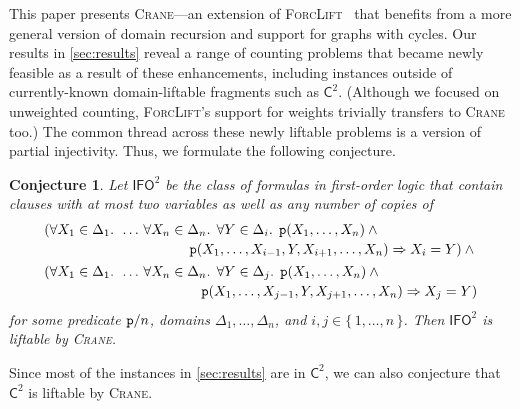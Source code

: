 \documentclass{article}
\newtheorem{conjecture}{Conjecture}
\newcommand{\Ctwo}{$\mathsf{C}^{2}$}
\newcommand{\IFO}{$\mathsf{I}\mathsf{FO}^{2}$}
\newcommand{\predicate}{\texttt{\textup{p}}}
\begin{document}
This paper presents \textsc{Crane}---an extension of
\textsc{ForcLift}~\cite{DBLP:conf/ijcai/BroeckTMDR11} that benefits from a more
general version of domain recursion and support for graphs with cycles. Our
results in \cref{sec:results} reveal a range of counting problems that became
newly feasible as a result of these enhancements, including instances outside of
currently-known domain-liftable fragments such as \Ctwo{}. (Although we focused
on unweighted counting, \textsc{ForcLift}'s support for weights trivially
transfers to \textsc{Crane} too.) The common thread across these newly liftable
problems is a version of partial injectivity. Thus, we formulate the following
conjecture.
\begin{conjecture}
  Let \IFO{} be the class of formulas in first-order logic that contain clauses
  with at most two variables as well as any number of copies of
  \begin{align*}
    &\begin{multlined}[t][0.9\linewidth]
      (\forall X_{1} \in \Delta_{1}\text{. }\dots\,\forall X_{n} \in \Delta_{n}\text{. }\forall Y \in \Delta_{i}\text{. }\predicate(X_{1}, \dots, X_{n}) \land{}\\
      \predicate(X_{1}, \dots, X_{i-1}, Y, X_{i+1}, \dots, X_{n}) \Rightarrow X_{i} = Y) \land{}
    \end{multlined}\\
    &\begin{multlined}[t][0.9\linewidth]
      (\forall X_{1} \in \Delta_{1}\text{. }\dots\,\forall X_{n} \in \Delta_{n}\text{. }\forall Y \in \Delta_{j}\text{. }\predicate(X_{1}, \dots, X_{n}) \land{}\\
      \predicate(X_{1}, \dots, X_{j-1}, Y, X_{j+1}, \dots, X_{n}) \Rightarrow X_{j} = Y)
    \end{multlined}
  \end{align*}
  for some predicate $\predicate/n$, domains
  $\Delta_{1}, \dots, \Delta_{n}$, and $i, j \in \{\, 1, \dots, n \,\}$. Then
  \IFO{} is liftable by \textsc{Crane}.
\end{conjecture}
Since most of the instances in \cref{sec:results} are in \Ctwo{}, we can also
conjecture that \Ctwo{} is liftable by \textsc{Crane}.
\end{document}
